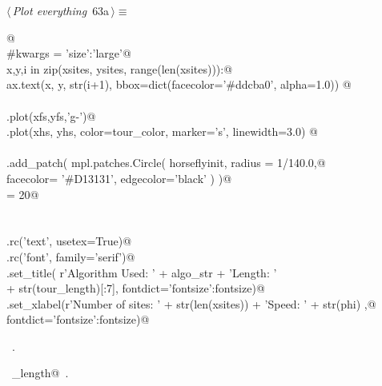 \documentclass[11.5pt]{report}
\begin{document}
\vspace{-0.8cm} \newchunk
\begin{flushleft} \small
\begin{minipage}{\linewidth}\label{scrap90}\raggedright\small
{} $\langle\,${\itshape Plot everything}\nobreak\ {\footnotesize {63a}}$\,\rangle\equiv$
\vspace{-1ex}
\begin{list}{}{} \item
\mbox{}\verb@ @\\
\mbox{}\verb@#kwargs = {'size':'large'}@\\
\mbox{}\verb@for x,y,i in zip(xsites, ysites, range(len(xsites))):@\\
\mbox{}\verb@    ax.text(x, y, str(i+1), bbox=dict(facecolor='#ddcba0', alpha=1.0)) @\\
\mbox{}\verb@@\\
\mbox{}\verb@ax.plot(xfs,yfs,'g-')@\\
\mbox{}\verb@ax.plot(xhs, yhs, color=tour_color, marker='s', linewidth=3.0) @\\
\mbox{}\verb@@\\
\mbox{}\verb@ax.add_patch( mpl.patches.Circle( horseflyinit, radius = 1/140.0,@\\
\mbox{}\verb@                                  facecolor= '#D13131', edgecolor='black'   )  )@\\
\mbox{}\verb@fontsize = 20@\\
\mbox{}\verb@@\\
\mbox{}\verb@@\\
\mbox{}\verb@plt.rc('text', usetex=True)@\\
\mbox{}\verb@plt.rc('font', family='serif')@\\
\mbox{}\verb@ax.set_title( r'Algorithm Used: ' + algo_str +  '\nTour Length: ' \@\\
\mbox{}\verb@               + str(tour_length)[:7], fontdict={'fontsize':fontsize})@\\
\mbox{}\verb@ax.set_xlabel(r'Number of sites: ' + str(len(xsites)) + '\nDrone Speed: ' + str(phi) ,@\\
\mbox{}\verb@                  fontdict={'fontsize':fontsize})@\\
\mbox{}\verb@@{\NWsep}
\end{list}
\vspace{-1.5ex}
\footnotesize
\begin{list}{}{\setlength{\itemsep}{-\parsep}\setlength{\itemindent}{-\leftmargin}}
\item \NWtxtMacroRefIn\ .
\item \NWtxtIdentsUsed\nobreak\  \verb@tour_length@\nobreak\ .
\item{}
\end{list}
\end{minipage}\vspace{4ex}
\end{flushleft}
\end{document}

